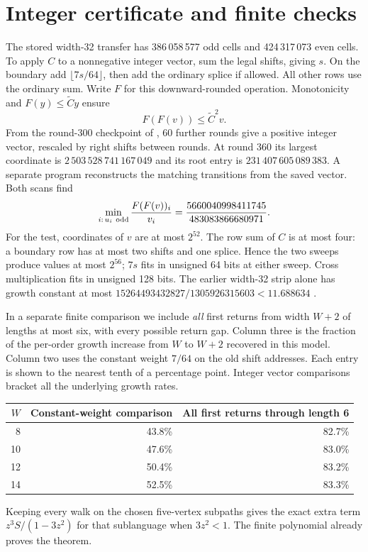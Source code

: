 \documentclass[11pt]{article}
\newcommand{\numx}{5660040998411745}
\newcommand{\denx}{483083866680971}
\begin{document}
\newpage
\section{Integer certificate and finite checks}
The stored width-32 transfer has 386\,058\,577 odd cells and 424\,317\,073 even cells. To apply \(C\) to a nonnegative integer vector, sum the legal shifts, giving \(s\). On the boundary add \(\lfloor 7s/64\rfloor\), then add the ordinary splice if allowed. All other rows use the ordinary sum. Write \(F\) for this downward-rounded operation. Monotonicity and \(F(y)\le\widetilde C y\) ensure
\[
                F(F(v))\le \widetilde C^2 v .
\]
From the round-300 checkpoint of \cite{prior}, 60 further rounds give a positive integer vector, rescaled by right shifts between rounds. At round 360 its largest coordinate is \(2\,503\,528\,741\,167\,049\) and its root entry is \(231\,407\,605\,089\,383\). A separate program reconstructs the matching transitions from the saved vector. Both scans find
\[
                 \min_{i:\,u_i\ {\rm odd}}\frac{F(F(v))_i}{v_i}
                        =\frac{\numx}{\denx}.
\]
For the test, coordinates of \(v\) are at most \(2^{52}\). The row sum of \(C\) is at most four: a boundary row has at most two shifts and one splice. Hence the two sweeps produce values at most \(2^{56}\); \(7s\) fits in unsigned 64 bits at either sweep. Cross multiplication fits in unsigned 128 bits. The earlier width-32 strip alone has growth constant at most \(15264493432827/1305926315603<11.688634\) \cite{prior}.

In a separate finite comparison we include \emph{all} first returns from width \(W+2\) of lengths at most six, with every possible return gap. Column three is the fraction of the per-order growth increase from \(W\) to \(W+2\) recovered in this model. Column two uses the constant weight \(7/64\) on the old shift addresses. Each entry is shown to the nearest tenth of a percentage point. Integer vector comparisons bracket all the underlying growth rates.
\begin{center}
\begin{tabular}{rrr}\toprule
\(W\)&Constant-weight comparison& All first returns through length 6\\\midrule
8 &43.8\%&82.7\%\\
10&47.6\%&83.0\%\\
12&50.4\%&83.2\%\\
14&52.5\%&83.3\%\\\bottomrule
\end{tabular}
\end{center}
Keeping every walk on the chosen five-vertex subpaths gives the exact extra term \(z^3S/(1-3z^2)\) for that sublanguage when \(3z^2<1\). The finite polynomial already proves the theorem.
\end{document}
